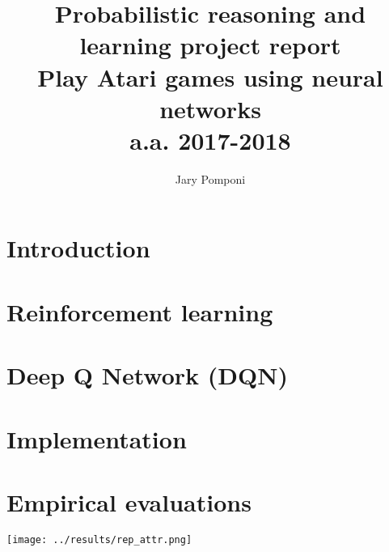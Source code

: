 \documentclass[10pt]{article}
\title{ 
	Probabilistic reasoning and learning project report \protect\\ Play Atari games using neural networks \protect\\  \large a.a. 2017-2018}
\author{ Jary Pomponi}
\date{\vspace{-5ex}}
\begin{document}
	\maketitle
\begin{multicols}{2}
\section{Introduction}
\section{Reinforcement learning}
\section{Deep Q Network (DQN)}
\section{Implementation}
\section{Empirical evaluations}
\iffalse
\begin{center}
	\centering
	\texttt{[image: ../results/rep\_attr.png]}
	\setcounter{figure}{0}  
	\label{fig}  
\end{center}

\end{multicols}
\end{document}

